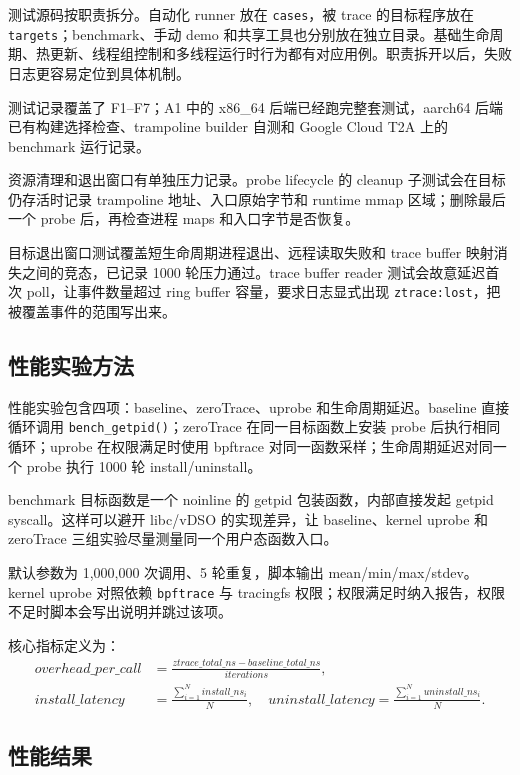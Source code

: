 \documentclass[UTF8,a4paper,11pt,fontset=fandol]{ctexart}
\newcommand{\code}[1]{\texttt{#1}}
\begin{document}
测试源码按职责拆分。自动化 runner 放在 \code{cases}，被 trace 的目标程序放在 \code{targets}；benchmark、手动 demo 和共享工具也分别放在独立目录。基础生命周期、热更新、线程组控制和多线程运行时行为都有对应用例。职责拆开以后，失败日志更容易定位到具体机制。

测试记录覆盖了 F1--F7；A1 中的 x86\_64 后端已经跑完整套测试，aarch64 后端已有构建选择检查、trampoline builder 自测和 Google Cloud T2A 上的 benchmark 运行记录。

资源清理和退出窗口有单独压力记录。probe lifecycle 的 cleanup 子测试会在目标仍存活时记录 trampoline 地址、入口原始字节和 runtime mmap 区域；删除最后一个 probe 后，再检查进程 maps 和入口字节是否恢复。

目标退出窗口测试覆盖短生命周期进程退出、远程读取失败和 trace buffer 映射消失之间的竞态，已记录 1000 轮压力通过。trace buffer reader 测试会故意延迟首次 poll，让事件数量超过 ring buffer 容量，要求日志显式出现 \code{ztrace:lost}，把被覆盖事件的范围写出来。

\subsection{性能实验方法}

性能实验包含四项：baseline、zeroTrace、uprobe 和生命周期延迟。baseline 直接循环调用 \code{bench\_getpid()}；zeroTrace 在同一目标函数上安装 probe 后执行相同循环；uprobe 在权限满足时使用 bpftrace 对同一函数采样；生命周期延迟对同一个 probe 执行 1000 轮 install/uninstall。

benchmark 目标函数是一个 noinline 的 getpid 包装函数，内部直接发起 getpid syscall。这样可以避开 libc/vDSO 的实现差异，让 baseline、kernel uprobe 和 zeroTrace 三组实验尽量测量同一个用户态函数入口。

默认参数为 1,000,000 次调用、5 轮重复，脚本输出 mean/min/max/stdev。kernel uprobe 对照依赖 \code{bpftrace} 与 tracingfs 权限；权限满足时纳入报告，权限不足时脚本会写出说明并跳过该项。

核心指标定义为：
\begin{equation}
\begin{aligned}
  overhead\_per\_call &=
  \frac{ztrace\_total\_ns - baseline\_total\_ns}{iterations},\\
  install\_latency &=
  \frac{\sum_{i=1}^{N} install\_ns_i}{N}, \quad
  uninstall\_latency =
  \frac{\sum_{i=1}^{N} uninstall\_ns_i}{N}.
\end{aligned}
\end{equation}

\subsection{性能结果}
\end{document}
